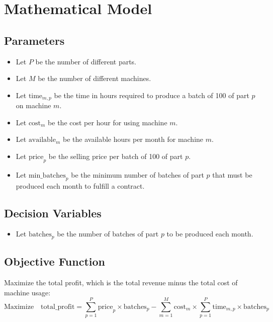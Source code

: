 \documentclass{article}
\begin{document}
\section*{Mathematical Model}

\subsection*{Parameters}
\begin{itemize}
    \item Let \( P \) be the number of different parts.
    \item Let \( M \) be the number of different machines.
    \item Let \( \text{time}_{m,p} \) be the time in hours required to produce a batch of 100 of part \( p \) on machine \( m \).
    \item Let \( \text{cost}_{m} \) be the cost per hour for using machine \( m \).
    \item Let \( \text{available}_{m} \) be the available hours per month for machine \( m \).
    \item Let \( \text{price}_{p} \) be the selling price per batch of 100 of part \( p \).
    \item Let \( \text{min\_batches}_{p} \) be the minimum number of batches of part \( p \) that must be produced each month to fulfill a contract.
\end{itemize}

\subsection*{Decision Variables}
\begin{itemize}
    \item Let \( \text{batches}_{p} \) be the number of batches of part \( p \) to be produced each month.
\end{itemize}

\subsection*{Objective Function}
Maximize the total profit, which is the total revenue minus the total cost of machine usage:
\[
\text{Maximize} \quad \text{total\_profit} = \sum_{p=1}^{P} \text{price}_{p} \times \text{batches}_{p} - \sum_{m=1}^{M} \text{cost}_{m} \times \sum_{p=1}^{P} \text{time}_{m,p} \times \text{batches}_{p}
\]
\end{document}
